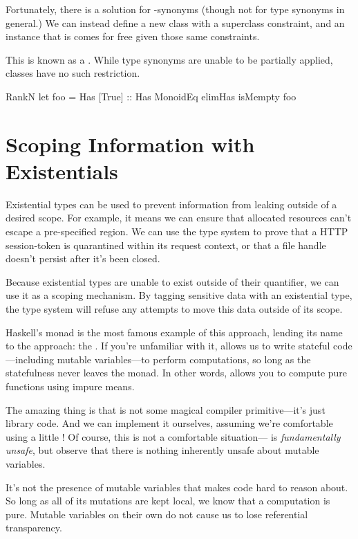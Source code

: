 \documentclass[book.tex]{subfiles}
\begin{document}
Fortunately, there is a solution for -synonyms (though not for
type synonyms in general.) We can instead define a new class with a superclass
constraint, and an instance that is comes for free given those same
constraints.


This is known as a . While type synonyms are unable to
be partially applied, classes have no such restriction.

\begin{dorepl}{RankN}
let foo = Has [True] :: Has MonoidEq
elimHas isMempty foo
\end{dorepl}


\section{Scoping Information with Existentials}


Existential types can be used to prevent information from leaking outside of a
desired scope. For example, it means we can ensure that allocated resources
can't escape a pre-specified region. We can use the type system to prove that a
HTTP session-token is quarantined within its request context, or that a file
handle doesn't persist after it's been closed.

Because existential types are unable to exist outside of their quantifier, we
can use it as a scoping mechanism. By tagging sensitive data with an existential
type, the type system will refuse any attempts to move this data outside of its
scope.

Haskell's  monad is the most famous example of this approach, lending its
name to the approach: the . If you're unfamiliar with it, 
allows us to write stateful code---including mutable variables---to perform
computations, so long as the statefulness never leaves the monad. In other
words,  allows you to compute pure functions using impure means.

The amazing thing is that  is not some magical compiler primitive---it's
just library code. And we can implement it ourselves, assuming we're comfortable
using a little ! Of course, this is not a comfortable
situation--- is \emph{fundamentally unsafe}, but observe
that there is nothing inherently unsafe about mutable variables.

It's not the presence of mutable variables that makes code hard to reason about.
So long as all of its mutations are kept local, we know that a computation is
pure. Mutable variables on their own do not cause us to lose referential
transparency.
\end{document}
